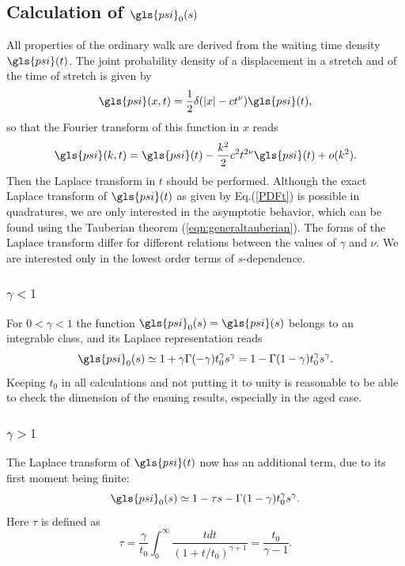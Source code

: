 \subsection{Calculation of $\gls{psi}_0(s)$}
All properties of the ordinary walk are derived from the waiting time density $\gls{psi}(t)$. The joint probability density of a displacement in a stretch and of the time of stretch is given by
\begin{equation}
 \gls{psi}(x,t) = \frac{1}{2} \delta(|x| - ct^\nu ) \gls{psi}(t),
\end{equation}
so that the Fourier transform of this function in $x$ reads
\begin{equation}
 \gls{psi}(k,t) = \gls{psi}(t) - \frac{k^2}{2} c^2 t^{2 \nu} \gls{psi}(t) + o(k^2). 
\end{equation}
Then the Laplace transform in $t$ should be performed.  Although the exact Laplace transform of $\gls{psi}(t)$ as given by Eq.(\ref{PDFt}) is possible in quadratures, 
we are only interested in the asymptotic behavior, which can be found using the Tauberian theorem (\ref{eqn:generaltauberian}). The forms of the Laplace transform 
differ for different relations between the values of $\gamma$ and $\nu$. We are interested only in the lowest order terms
of $s$-dependence. 

\subsubsection{$ \gamma<1$}
For $0<\gamma <1$ the function $ \gls{psi}_0(s) = \gls{psi}(s)$ belongs to an integrable class, and its Laplace representation reads
\begin{equation}
 \gls{psi}_0(s) \simeq 1 + \gamma \Gamma(-\gamma) t_0^\gamma s^\gamma 
 = 1-\Gamma(1-\gamma) t_0^\gamma s^\gamma. \label{eqn:psi0GammaSmall}
\end{equation}
Keeping $t_0$ in all calculations and not putting it to unity is reasonable to be able to check the dimension of the ensuing results, especially in the aged case. 

\subsubsection{$ \gamma>1$}
The Laplace transform of $\gls{psi}(t)$ now has an additional term, due to its first moment being finite:
\begin{equation}
\gls{psi}_{0}(s) \simeq 1 - \tau s - \Gamma(1-\gamma ) t_0^\gamma s^\gamma.
\label{eqn:psi0GammaBig}
\end{equation}  
Here $\tau$ is defined as 
\begin{equation}
 \tau = \frac{\gamma}{t_0} \int_0^\infty \frac{t dt}{(1+t/t_0)^{\gamma +1}} = 
 \frac{t_0}{\gamma-1} . \label{eq:tau}
\end{equation}

